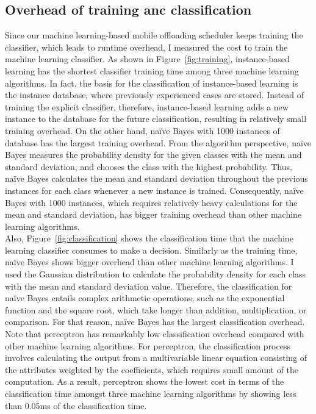 {{\subsection{Overhead of training anc classification}
\label{online:overhead}
Since our machine learning-based mobile offloading scheduler keeps
training the classifier, which leads to runtime overhead, I
measured the cost to train the machine learning classifier.
%
As shown in Figure~\ref{fig:training}, instance-based learning has the shortest
classifier training time among three machine learning algorithms.  
%
In fact, the basis for the classification of instance-based learning is
the instance database, where previously experienced cases are stored.
%
Instead of training the explicit classifier, therefore, instance-based
learning adds a new instance to the database for the future
classification, resulting in relatively small training overhead.
%
On the other hand, na\"{i}ve Bayes with 1000 instances of database has
the largest training overhead. 
%
From the algorithm perspective, na\"{i}ve Bayes measures the
probability density for the given classes with the mean and standard
deviation, and chooses the class with the highest probability.
%
Thus, na\"{i}ve Bayes calculates the mean and standard deviation
throughout the previous instances for each class whenever a new instance
is trained.
%
Consequently, na\"{i}ve Bayes with 1000 instances, which requires
relatively heavy calculations for the mean and standard deviation, has
bigger training overhead than other machine learning algorithms.\\
%
Also, Figure~\ref{fig:classification} shows the classification time that the machine
learning classifier consumes to make a decision.
%
Similarly as the training time, na\"{i}ve Bayes shows bigger overhead
than other machine learning algorithms.
%
I used the Gaussian distribution to calculate the probability
density for each class with the mean and standard deviation value.
%
Therefore, the classification for na\"{i}ve Bayes entails complex
arithmetic operations, such as the exponential function and the square
root, which take longer than addition, multiplication, or comparison.
%
For that reason, na\"{i}ve Bayes has the largest classification overhead.
%
Note that perceptron has remarkably low classification overhead compared
with other machine learning algorithms. 
%
For perceptron, the classification process involves calculating the
output from a multivariable linear equation consisting of the attributes
weighted by the coefficients, which requires small amount of
the computation. 
%
As a result, perceptron shows the lowest cost in terms of the
classification time amongst three machine learning algorithms by showing
less than 0.05ms of the classification time.
%

}}
